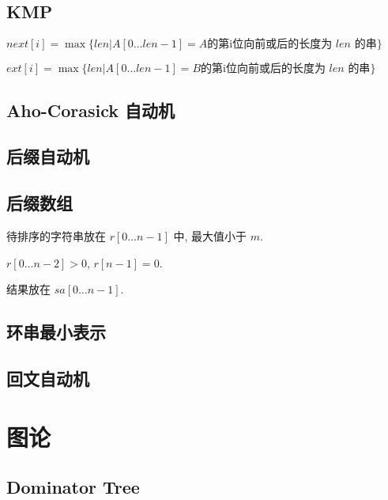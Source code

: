 \documentclass[landscape, twocolumn, 8pt, a4paper, twoside]{extarticle}
\begin{document}
\begin{spacing}{0.1}
\subsection{KMP}
$next[i] = \max\{len | A[0 \ldots len - 1] = A \textrm{的第i位向前或后的长度为 $len$ 的串} \}$

$ext[i] = \max\{len | A[0 \ldots len - 1] = B \textrm{的第i位向前或后的长度为 $len$ 的串} \}$


\subsection{Aho-Corasick 自动机}


\subsection{后缀自动机}


\subsection{后缀数组}
待排序的字符串放在 $r[0 \ldots n - 1]$ 中, 最大值小于 $m$.

$r[0 \ldots n - 2] > 0$, $r[n - 1] = 0$.

结果放在 $sa[0 \ldots n - 1]$.


\subsection{环串最小表示}

\subsection{回文自动机}


\section{图论}
\subsection{Dominator Tree}


%


\end{spacing}
\end{document}
